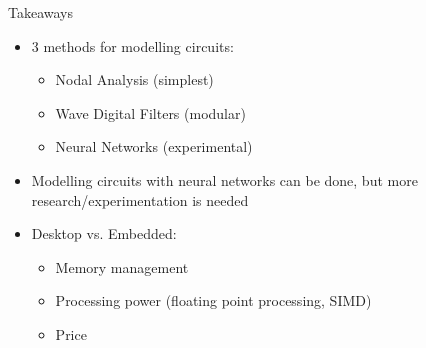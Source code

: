 \begin{frame}{Takeaways}
    \begin{itemize}
        \itemsep0.75em
        \item 3 methods for modelling circuits:
        \begin{itemize}
            \item Nodal Analysis (simplest)
            \item Wave Digital Filters (modular)
            \item Neural Networks (experimental)
        \end{itemize}
        \item Modelling circuits with neural networks can be done, but more research/experimentation is needed
        \item Desktop vs. Embedded:
        \begin{itemize}
            \item Memory management
            \item Processing power (floating point processing, SIMD)
            \item Price
        \end{itemize}
    \end{itemize}
\end{frame}
